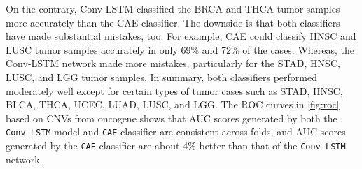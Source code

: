 \hspace*{3.5mm} On the contrary, Conv-LSTM classified the BRCA and THCA tumor samples more accurately than the CAE classifier. The downside is that both classifiers have made substantial mistakes, too. For example, CAE could classify HNSC and LUSC tumor samples accurately in only 69\% and 72\% of the cases. Whereas, the Conv-LSTM network made more mistakes, particularly for the STAD, HNSC, LUSC, and LGG tumor samples. In summary, both classifiers performed moderately well except for certain types of tumor cases such as STAD, HNSC, BLCA, THCA, UCEC, LUAD, LUSC, and LGG. The ROC curves in \cref{fig:roc} based on CNVs from oncogene shows that AUC scores generated by both the \texttt{Conv-LSTM} model and \texttt{CAE} classifier are consistent across folds, and AUC scores generated by the \texttt{CAE} classifier are about 4\% better than that of the \texttt{Conv-LSTM} network.

